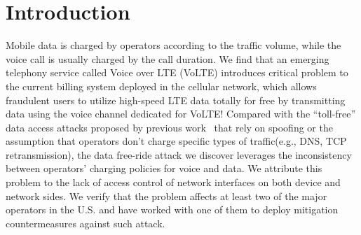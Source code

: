 

\section{Introduction}

Mobile data is charged by operators according to the traffic volume, while the voice call is usually charged by the call duration. We find that an emerging telephony service called Voice over LTE (VoLTE) introduces critical problem to the current billing system deployed in the cellular network, which allows fraudulent users to utilize high-speed LTE data totally for free by transmitting data using the voice channel dedicated for VoLTE! Compared with the ``toll-free'' data access attacks proposed by previous work~\cite{peng2012mobile,go2014gaining} that rely on spoofing or the assumption that operators don't charge specific types of traffic(e.g., DNS, TCP retransmission), the data free-ride attack we discover leverages the inconsistency between operators' charging policies for voice and data. We attribute this problem to the lack of access control of network interfaces on both device and network sides. We verify that the problem affects at least two of the major operators in the U.S. and have worked with one of them to deploy mitigation countermeasures against such attack. 

